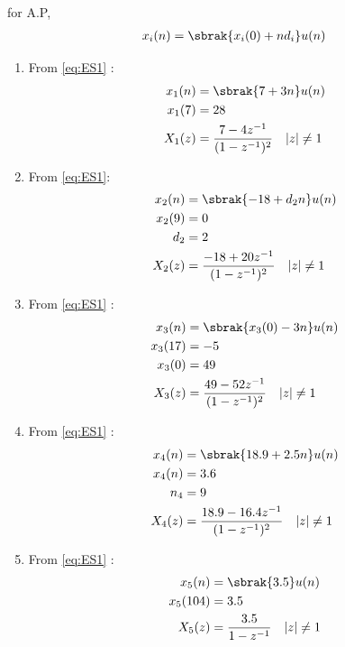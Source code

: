 \documentclass[journal,12pt,twocolumn]{IEEEtran}
\theoremstyle{remark}
\begin{document}
\begin{table}[h!]
  \centering
  
   \label{tab:ESTable1}
\end{table}
\solution
\fi
for A.P,
\begin{align}
    x_i(n) = \sbrak{x_i(0) + nd_i} u(n)
    \label{eq:ES1}
\end{align}
\begin{enumerate}
\item From \eqref{eq:ES1} :
\begin{align}
x_1(n) &= \sbrak{7+3n}u(n)\\
x_1(7) &= 28\\
X_1(z) &= \frac{7 - 4z^{-1}}{(1 - z^{-1})^2} \quad |z| \neq 1
\end{align}
\item From \eqref{eq:ES1}:
\begin{align}
x_2(n) &= \sbrak{-18 + d_2n}u(n)\\
x_2(9) &= 0\\
d_2 &= 2\\
X_2(z) &= \frac{-18 + 20z^{-1}}{(1 - z^{-1})^2}
 \quad |z| \neq 1
\end{align}
\item From \eqref{eq:ES1} :
\begin{align}
x_3(n) &= \sbrak{x_3(0)-3n}u(n)\\
x_3(17) &= -5\\
x_3(0) &= 49\\
X_3(z) &= \frac{49 - 52z^{-1}}{(1 - z^{-1})^2}
 \quad |z| \neq 1
\end{align}
\item From \eqref{eq:ES1} :
\begin{align}
x_4(n) &= \sbrak{18.9+2.5n}u(n)\\
x_4(n) &= 3.6\\
n_4    &= 9\\
X_4(z) &= \frac{18.9 - 16.4z^{-1}}{(1 - z^{-1})^2}
 \quad |z| \neq 1
\end{align}
\item From \eqref{eq:ES1}  :
\begin{align}
x_5(n) &= \sbrak{3.5}u(n)\\
x_5(104) &= 3.5\\
X_5(z) &= \frac{3.5}{1-z^{-1}} \quad |z| \neq 1
\end{align}
\begin{figure}[h!]
    \centering

\end{figure}
\end{enumerate}
\end{document}
